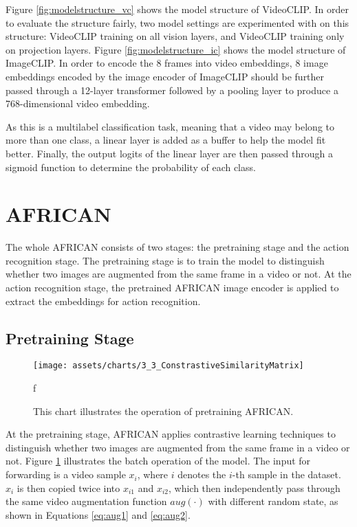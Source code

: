Figure \ref{fig:modelstructure_vc} shows the model structure of VideoCLIP. In order to evaluate the structure fairly, two model settings are experimented with on this structure: VideoCLIP training on all vision layers, and VideoCLIP training only on projection layers. Figure \ref{fig:modelstructure_ic} shows the model structure of ImageCLIP. In order to encode the 8 frames into video embeddings, 8 image embeddings encoded by the image encoder of ImageCLIP should be further passed through a 12-layer transformer followed by a pooling layer to produce a 768-dimensional video embedding.

As this is a multilabel classification task, meaning that a video may belong to more than one class, a linear layer is added as a buffer to help the model fit better. Finally, the output logits of the linear layer are then passed through a sigmoid function to determine the probability of each class. 

\section{AFRICAN}
The whole AFRICAN consists of two stages: the pretraining stage and the action recognition stage. The pretraining stage is to train the model to distinguish whether two images are augmented from the same frame in a video or not. At the action recognition stage, the pretrained AFRICAN image encoder is applied to extract the embeddings for action recognition. 

\subsection{Pretraining Stage}

\begin{figure}[ht]
    \centering
    \texttt{[image: assets/charts/3\_3\_ConstrastiveSimilarityMatrix]}
    \caption[Operation of pretraining AFRICAN]{This chart illustrates the operation of pretraining AFRICAN.}
f\label{fig:modelstructafsim}
\end{figure}

At the pretraining stage, AFRICAN applies contrastive learning techniques to distinguish whether two images are augmented from the same frame in a video or not. Figure \ref{fig:modelstructafsim} illustrates the batch operation of the model. The input for forwarding is a video sample $x_i$, where $i$ denotes the $i$-th sample in the dataset. $x_i$ is then copied twice into $x_{i1}$ and $x_{i2}$, which then independently pass through the same video augmentation function $aug(\cdot)$ with different random state, as shown in Equations \ref{eq:aug1} and \ref{eq:aug2}. 

